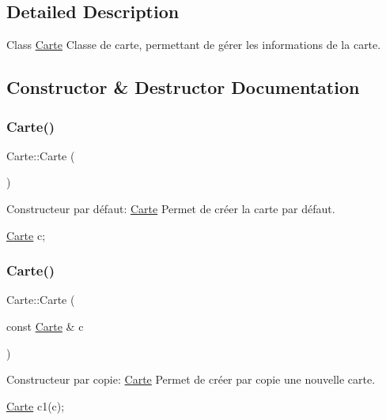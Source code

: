 \subsection{Detailed Description}
Class \hyperlink{classCarte}{Carte} Classe de carte, permettant de gérer les informations de la carte. 

\subsection{Constructor \& Destructor Documentation}
\mbox{\label{classCarte_a06daaca86c31c80f8308f4a81d46dc9b}} 
\subsubsection{\texorpdfstring{Carte()}{Carte()}\hspace{0.1cm}{\footnotesize\ttfamily [1/3]}}
{\footnotesize\ttfamily Carte\+::\+Carte (\begin{DoxyParamCaption}{ }\end{DoxyParamCaption})}



Constructeur par défaut\+: \hyperlink{classCarte}{Carte} Permet de créer la carte par défaut. 


\begin{DoxyCode}
\hyperlink{classCarte}{Carte} c;
\end{DoxyCode}
 \mbox{\label{classCarte_afe56c0ec89cb3cf0332755204b576a2d}} 
\subsubsection{\texorpdfstring{Carte()}{Carte()}\hspace{0.1cm}{\footnotesize\ttfamily [2/3]}}
{\footnotesize\ttfamily Carte\+::\+Carte (\begin{DoxyParamCaption}\item[{const \hyperlink{classCarte}{Carte} \&}]{c }\end{DoxyParamCaption})}



Constructeur par copie\+: \hyperlink{classCarte}{Carte} Permet de créer par copie une nouvelle carte. 


\begin{DoxyCode}
\hyperlink{classCarte}{Carte} c1(c);
\end{DoxyCode}
 \mbox{\label{classCarte_acf6679e07683a19586bd9dc0f699d8b4}} 
